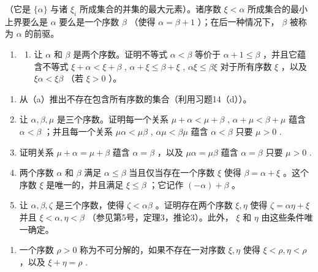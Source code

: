 （它是 \(\{\alpha\}\) 与诸 \(\xi_{i}\) 所成集合的并集的最大元素）。诸序数 \(\xi < \alpha\) 所成集合的最小上界要么是 \(\alpha\) 要么是一个序数 \(\beta\) （使得 \(\alpha = \beta + 1\) ）；在后一种情况下， \(\beta\) 被称为 \(\alpha\) 的前驱。

\begin{enumerate}
\def\labelenumi{\arabic{enumi}.}
\setcounter{enumi}{14}
\tightlist
\item
  \begin{enumerate}
  \def\labelenumii{(\alph{enumii})}
  \tightlist
  \item
    让 \(\alpha\) 和 \(\beta\) 是两个序数。证明不等式 \(\alpha < \beta\) 等价于 \(\alpha + 1 \leqslant \beta\) ，并且它蕴含不等式 \(\xi + \alpha < \xi + \beta\) , \(\alpha + \xi \leqslant \beta + \xi\) , \(\alpha\xi \leqslant \beta\xi\) 对于所有序数 \(\xi\) ，以及 \(\xi\alpha < \xi\beta\) （若 \(\xi > 0\) ）。
  \end{enumerate}
\end{enumerate}

\begin{enumerate}
\def\labelenumi{(\alph{enumi})}
\setcounter{enumi}{1}
\item
  从（a）推出不存在包含所有序数的集合（利用习题14（d））。
\item
  让 \(\alpha, \beta, \mu\) 是三个序数。证明每一个关系 \(\mu + \alpha < \mu + \beta\) , \(\alpha + \mu < \beta + \mu\) 蕴含 \(\alpha < \beta\) ；并且每一个关系 \(\mu \alpha < \mu \beta\) , \(\alpha \mu < \beta \mu\) 蕴含 \(\alpha < \beta\) 只要 \(\mu > 0\) .
\item
  证明关系 \(\mu + \alpha = \mu + \beta\) 蕴含 \(\alpha = \beta\) ，以及 \(\mu \alpha = \mu \beta\) 蕴含 \(\alpha = \beta\) 只要 \(\mu > 0\) .
\item
  两个序数 \(\alpha\) 和 \(\beta\) 满足 \(\alpha \leqslant \beta\) 当且仅当存在一个序数 \(\xi\) 使得 \(\beta = \alpha + \xi\) 。这个序数 \(\xi\) 是唯一的，并且满足 \(\xi \leqslant \beta\) ；它记作 \((- \alpha) + \beta\) 。
\item
  让 \(\alpha, \beta, \zeta\) 是三个序数，使得 \(\zeta < \alpha\beta\) 。证明存在两个序数 \(\xi, \eta\) 使得 \(\zeta = \alpha\eta + \xi\) 并且 \(\xi < \alpha, \eta < \beta\) （参见第5号，定理3，推论3）。此外， \(\xi\) 和 \(\eta\) 由这些条件唯一确定。
\end{enumerate}

\begin{enumerate}
\def\labelenumi{\arabic{enumi}.}
\setcounter{enumi}{15}
\tightlist
\item
  一个序数 \(\rho > 0\) 称为不可分解的，如果不存在一对序数 \(\xi, \eta\) 使得 \(\xi < \rho, \eta < \rho\) ，以及 \(\xi + \eta = \rho\) .
\end{enumerate}

